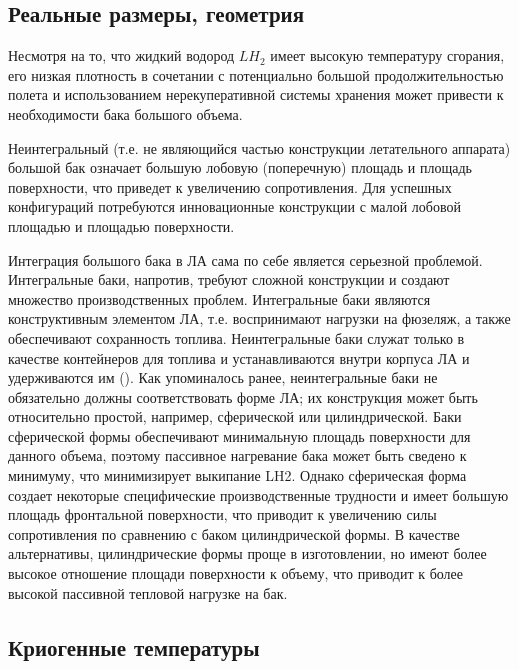 \subsection{Реальные размеры, геометрия}\label{ch:overview:1:sec2:sub1}

Несмотря на то, что жидкий водород \(LH_2\) имеет высокую температуру сгорания, его низкая плотность в сочетании с потенциально большой продолжительностью полета и использованием нерекуперативной системы хранения может привести к необходимости бака большого объема.

Неинтегральный (т.е. не являющийся частью конструкции летательного аппарата) большой бак означает большую лобовую (поперечную) площадь и площадь поверхности, что приведет к увеличению сопротивления. Для успешных конфигураций потребуются инновационные конструкции с малой лобовой площадью и площадью поверхности.

Интеграция большого бака в ЛА сама по себе является серьезной проблемой. Интегральные баки, напротив, требуют сложной конструкции и создают множество производственных проблем. Интегральные баки являются конструктивным элементом ЛА, т.е. воспринимают нагрузки на фюзеляж, а также обеспечивают сохранность топлива. Неинтегральные баки служат только в качестве контейнеров для топлива и устанавливаются внутри корпуса ЛА и удерживаются им (\cite{brewer1991}). Как упоминалось ранее, неинтегральные баки не обязательно должны соответствовать форме ЛА; их конструкция может быть относительно простой, например, сферической или цилиндрической. Баки сферической формы обеспечивают минимальную площадь поверхности для данного объема, поэтому пассивное нагревание бака может быть сведено к минимуму, что минимизирует выкипание LH2. Однако сферическая форма создает некоторые специфические производственные трудности и имеет большую площадь фронтальной поверхности, что приводит к увеличению силы сопротивления по сравнению с баком цилиндрической формы. В качестве альтернативы, цилиндрические формы проще в изготовлении, но имеют более высокое отношение площади поверхности к объему, что приводит к более высокой пассивной тепловой нагрузке на бак.

\subsection{Криогенные температуры}\label{ch:overview:1:sec2:sub2}

